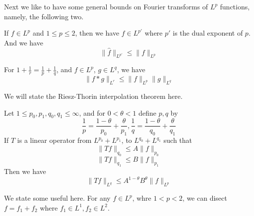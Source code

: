 \documentclass[lang=en,10pt, color=black]{../elegantbook}
\begin{document}
Next we like to have some general bounds on Fourier transforms of $L^p$ functions, namely, the following two.
\begin{theorem}
    If $f\in L^p$ and $1\leq p\leq 2$, then we have $f\in L^{p'}$ where $p'$ is the dual exponent of $p$. And we have
    \begin{equation*}
        \|\hat{f}\|_{L^{p'}}\leq\|f\|_{L^p}
    \end{equation*}
\end{theorem}
\begin{comment}
    It was proven using the Riesz-Thorin. We have $\|\hat{f}\|_{L^\infty}\leq\|f\|_{L^1}$, and $\|\hat{f}\|_{L^2}=\|f\|_{L^2}$.
\end{comment}
\begin{theorem}
    For $1+\frac{1}{r}=\frac{1}{p}+\frac{1}{q}$, and $f\in L^p$, $g\in L^q$, we have 
    \begin{equation*}
        \|f\ast g\|_{L^r}\leq\|f\|_{L^p}\|g\|_{L^q}
    \end{equation*}
\end{theorem}

We will state the Riesz-Thorin interpolation theorem here.
\begin{theorem}
    Let $1\leq p_0, p_1, q_0, q_1\leq\infty$, and for $0<\theta<1$ define $p,q$ by
    \begin{equation*}
        \frac{1}{p}=\frac{1-\theta}{p_0}+\frac{\theta}{p_1}, \frac{1}{q}=\frac{1-\theta}{q_0}+\frac{\theta}{q_1}
    \end{equation*}
    If $T$ is a linear operator from $L^{p_0}+L^{p_1}$, to $L^{q_0}+L^{q_1}$ such that
    \begin{equation*}
        \|Tf\|_{q_0}\leq A\|f\|_{p_0}
    \end{equation*}
    \begin{equation*}
        \|Tf\|_{q_1}\leq B\|f\|_{p_1}
    \end{equation*}
    Then we have
    \begin{equation*}
        \|Tf\|_{L^q}\leq A^{1-\theta}B^\theta\|f\|_{L^p}
    \end{equation*}
\end{theorem}
\begin{proposition}
    We state some useful here. For any $f\in L^p$, whre $1<p<2$, we can disect $f=f_1+f_2$ where $f_1\in L^1, f_2\in L^2$.
\end{proposition}
\begin{comment}
    We simply choose $f_1=f\chi_{x:|f(x)|>1}$.
\end{comment}
\end{document}
